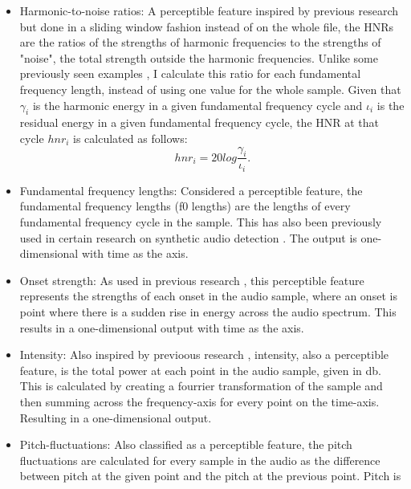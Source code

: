 \documentclass{article}
\begin{document}
			\begin{itemize}
				\item
					\sloppy
					Harmonic-to-noise ratios: A perceptible feature inspired by previous research
					\cite{chaiwongyen_contribution_2022,chaiwongyen_deepfake-speech_2023,
					li_comparative_2022} but done in a sliding window fashion instead of on the
					whole file, the HNRs are the ratios of the strengths of harmonic frequencies
					to the strengths of "noise", the total strength outside the harmonic
					frequencies. Unlike some previously seen examples
					\cite{chaiwongyen_contribution_2022, chaiwongyen_deepfake-speech_2023}, I
					calculate this ratio for each fundamental frequency length, instead of using
					one value for the whole sample. Given that \(\gamma_{i}\) is the harmonic
					energy in a given fundamental frequency cycle and \(\iota_{i}\) is the
					residual energy in a given fundamental frequency cycle, the HNR at that cycle
					\(hnr_{i}\) is calculated as follows:
					\[ hnr_{i} = 20log\frac{\gamma_{i}}{\iota_{i}}. \]
				\item
					Fundamental frequency lengths: Considered a perceptible feature, the
					fundamental frequency lengths (f0 lengths) are the lengths of every
					fundamental frequency cycle in the sample. This has also been previously used
					in certain research on synthetic audio detection \cite{xue_audio_2022}. The
					output is one-dimensional with time as the axis.
				\item
					Onset strength: As used in previous research \cite{li_comparative_2022}, this
					perceptible feature represents the strengths of each onset in the audio
					sample, where an onset is point where there is a sudden rise in energy across
					the audio spectrum. This results in a one-dimensional output with time as the
					axis.
				\item
					Intensity: Also inspired by previoous research \cite{li_comparative_2022},
					intensity, also a perceptible feature, is the total power at each point in the
					audio sample, given in db. This is calculated by creating a fourrier
					transformation of the sample and then summing across the frequency-axis for
					every point on the time-axis. Resulting in a one-dimensional output.
				\item
					Pitch-fluctuations: Also classified as a perceptible feature, the pitch
					fluctuations are calculated for every sample in the audio as the difference
					between pitch at the given point and the pitch at the previous point. Pitch is

\end{itemize}
\end{document}
